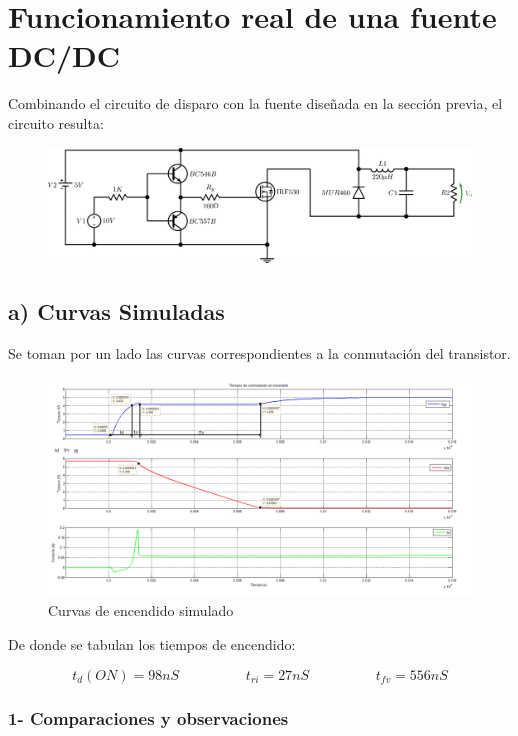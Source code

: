 \documentclass[e4_tp1_main.tex]{subfiles}
\begin{document}
\section{Funcionamiento real de una fuente DC/DC}

Combinando el circuito de disparo con la fuente diseñada en la sección previa, el circuito resulta:

\begin{figure}[H]
\centering
\includegraphics[width=1\linewidth]{Imagenes/Punto3/Circuito3.png}
\end{figure}

\subsection*{a) Curvas Simuladas}

Se toman por un lado las curvas correspondientes a la conmutación del transistor.

\begin{figure}[H]
\centering
\includegraphics[width=1\linewidth]{Imagenes/Punto3/tiempos_encendidoX.png}
\caption{Curvas de encendido simulado}
\end{figure}

De donde se tabulan los tiempos de encendido:

\[
t_d(ON) = 98nS \hspace{2cm} t_{ri} = 27nS \hspace{2cm} t_{fv} = 556nS
\]

\subsubsection*{1- Comparaciones y observaciones}
\end{document}

